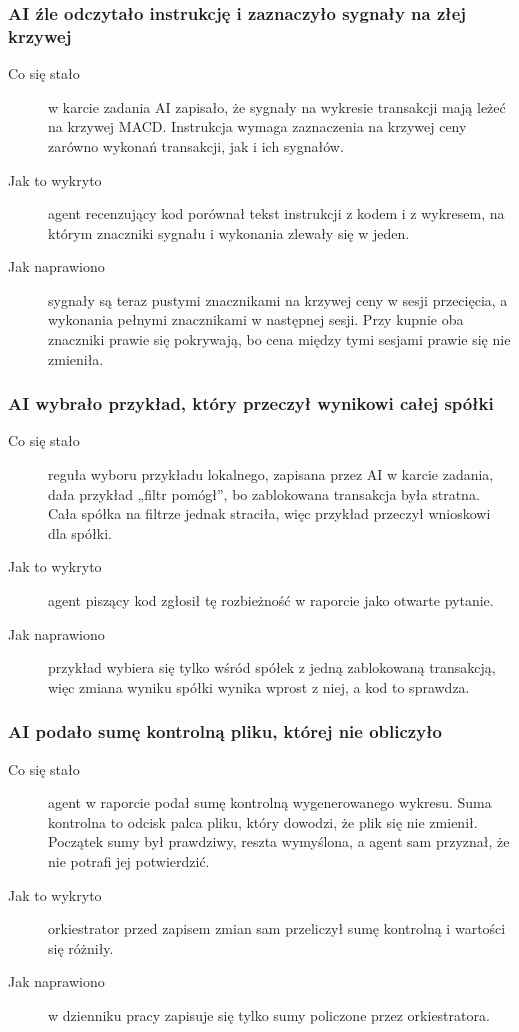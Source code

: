 
\begin{frame}
  \frametitle{AI źle odczytało instrukcję i zaznaczyło sygnały na złej krzywej}
  \begin{description}
    \item[Co się stało] w karcie zadania AI zapisało, że sygnały na wykresie
      transakcji mają leżeć na krzywej MACD. Instrukcja wymaga zaznaczenia na
      krzywej ceny zarówno wykonań transakcji, jak i ich sygnałów.
    \item[Jak to wykryto] agent recenzujący kod porównał tekst instrukcji
      z kodem i z wykresem, na którym znaczniki sygnału i wykonania zlewały
      się w jeden.
    \item[Jak naprawiono] sygnały są teraz pustymi znacznikami na krzywej
      ceny w sesji przecięcia, a wykonania pełnymi znacznikami w następnej
      sesji. Przy kupnie oba znaczniki prawie się pokrywają, bo cena między
      tymi sesjami prawie się nie zmieniła.
  \end{description}
\end{frame}

\begin{frame}
  \frametitle{AI wybrało przykład, który przeczył wynikowi całej spółki}
  \begin{description}
    \item[Co się stało] reguła wyboru przykładu lokalnego, zapisana przez AI
      w karcie zadania, dała przykład „filtr pomógł'', bo zablokowana
      transakcja była stratna. Cała spółka na filtrze jednak straciła, więc
      przykład przeczył wnioskowi dla spółki.
    \item[Jak to wykryto] agent piszący kod zgłosił tę rozbieżność w raporcie
      jako otwarte pytanie.
    \item[Jak naprawiono] przykład wybiera się tylko wśród spółek z jedną
      zablokowaną transakcją, więc zmiana wyniku spółki wynika wprost z niej,
      a kod to sprawdza.
  \end{description}
\end{frame}

\begin{frame}
  \frametitle{AI podało sumę kontrolną pliku, której nie obliczyło}
  \begin{description}
    \item[Co się stało] agent w raporcie podał sumę kontrolną wygenerowanego
      wykresu. Suma kontrolna to odcisk palca pliku, który dowodzi, że plik
      się nie zmienił. Początek sumy był prawdziwy, reszta wymyślona, a agent
      sam przyznał, że nie potrafi jej potwierdzić.
    \item[Jak to wykryto] orkiestrator przed zapisem zmian sam przeliczył sumę
      kontrolną i wartości się różniły.
    \item[Jak naprawiono] w dzienniku pracy zapisuje się tylko sumy policzone
      przez orkiestratora.
  \end{description}
\end{frame}
